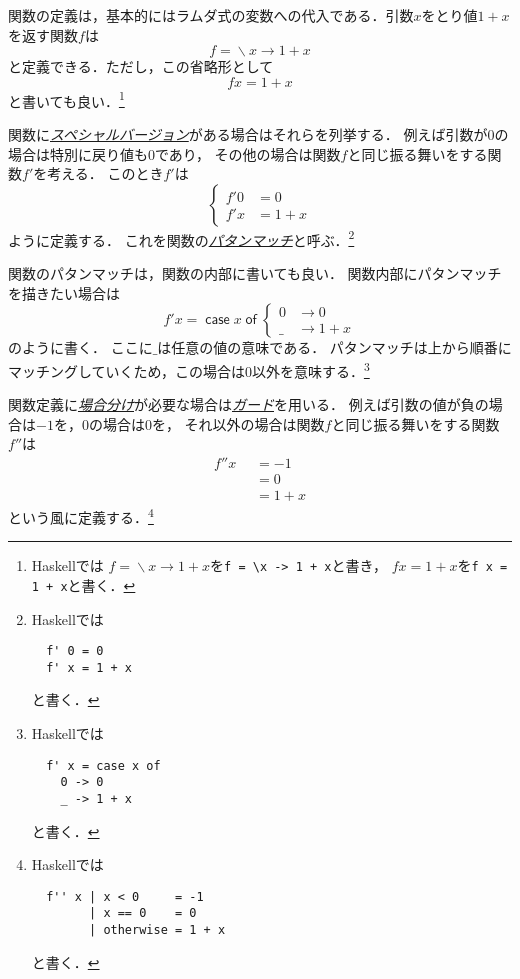 \documentclass[a5paper,draft]{jsbook}
\newcommand{\programminglanguage}[1]{\textsf{#1}}
\newcommand{\haskell}{\programminglanguage{Haskell}}
\newcommand{\keyword}[1]{{\underline{\emph{#1}}}}
\newcommand{\code}[1]{\texttt{#1}}
\newcommand{\mathGuard}[1]{\mathop{\mid_{#1}}}
\DeclareMathOperator{\mathLambda}{\backslash}
\newcommand{\mathLambdaArrow}{\rightarrow}
\newcommand{\mathKeyword}[1]{\operatorname{\textsf{#1}}}
\newcommand{\mathOtherwise}{\mathKeyword{otherwise}}
\newcommand{\mathCaseCase}{\mathKeyword{case}}
\newcommand{\mathCaseOf}{\mathKeyword{of}}
\newcommand{\mathCase}[2]{\mathCaseCase#1\mathCaseOf#2}
\newcommand{\mathLambdaExpression}[2]{\mathLambda#1\mathLambdaArrow#2}
\begin{document}
関数の定義は，基本的にはラムダ式の変数への代入である．引数$x$をとり値$1+x$を返す関数$f$は
\begin{equation}
f=\mathLambdaExpression{x}{1+x}
\end{equation}
と定義できる．ただし，この省略形として
\begin{equation}
fx=1+x
\end{equation}
と書いても良い．\footnote{\haskell では
$f=\mathLambdaExpression{x}{1+x}$を\code{f = \textbackslash x -> 1 + x}と書き，
$fx=1+x$を\code{f x = 1 + x}と書く．}

関数に\keyword{スペシャルバージョン}がある場合はそれらを列挙する．
例えば引数が$0$の場合は特別に戻り値も$0$であり，
その他の場合は関数$f$と同じ振る舞いをする関数$f'$を考える．
このとき$f'$は
\begin{equation}
\left\{
\begin{split}
f'0&=0\\
f'x&=1+x
\end{split}
\right.
\end{equation}
ように定義する．
これを関数の\keyword{パタンマッチ}と呼ぶ．\footnote{\haskell では
\begin{verbatim}
  f' 0 = 0
  f' x = 1 + x
\end{verbatim}
と書く．}

関数のパタンマッチは，関数の内部に書いても良い．
関数内部にパタンマッチを描きたい場合は
\begin{equation}
f'x=\mathCase{x}{\left\{
\begin{split}
0&\rightarrow0\\
\_&\rightarrow1+x
\end{split}
\right.}
\end{equation}
のように書く．
ここに$\_$は任意の値の意味である．
パタンマッチは上から順番にマッチングしていくため，この場合は$0$以外を意味する．\footnote{\haskell では
\begin{verbatim}
  f' x = case x of
    0 -> 0
    _ -> 1 + x
\end{verbatim}
と書く．}

関数定義に\keyword{場合分け}が必要な場合は\keyword{ガード}を用いる．
例えば引数の値が負の場合は$-1$を，$0$の場合は$0$を，
それ以外の場合は関数$f$と同じ振る舞いをする関数$f''$は
\begin{equation}
\begin{split}
f''x&\mathGuard{x<0}=-1\\
&\mathGuard{x\equiv 0}=0\\
&\mathGuard{\mathOtherwise}=1+x
\end{split}
\end{equation}
という風に定義する．\footnote{\haskell では
\begin{verbatim}
  f'' x | x < 0     = -1
        | x == 0    = 0
        | otherwise = 1 + x
\end{verbatim}
と書く．}
\end{document}
